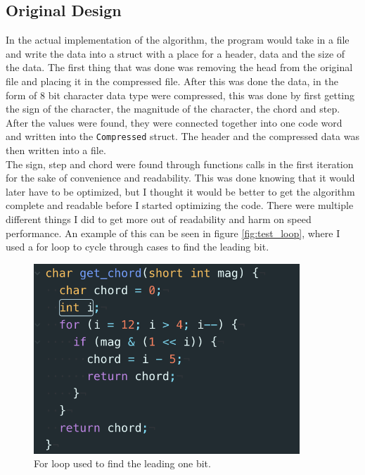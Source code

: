 \documentclass[12pt]{article}
\begin{document}
\subsection{Original Design}

In the actual implementation of the algorithm, the program would take in a file and write the data into a struct with a place for a header, data and the size of the data. The first thing that was done was removing the head from the original file and placing it in the compressed file. After this was done the data, in the form of 8 bit character data type were compressed, this was done by first getting the sign of the character, the magnitude of the character, the chord and step. After the values were found, they were connected together into one code word and written into the \texttt{Compressed} struct. The header and the compressed data was then written into a file.\\

The sign, step and chord were found through functions calls in the first iteration for the sake of convenience and readability. This was done knowing that it would later have to be optimized, but I thought it would be better to get the algorithm complete and readable before I started optimizing the code. There were multiple different things I did to get more out of readability and harm on speed performance. An example of this can be seen in figure \ref{fig:test_loop}, where I used a for loop to cycle through cases to find the leading bit.\\

\begin{figure}[!h]
		\centering
        \includegraphics[width=10cm ]
        {get_chord_for_loop.png}
        \caption{\label{fig:chord_loop} For loop used to find the leading one bit.}
\end{figure}
\end{document}
